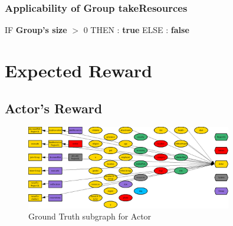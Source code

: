 \documentclass{article}%
\begin{document}
%
\subsubsection{Applicability of Group takeResources}%
\label{ssubsec:Applicability of Group takeResources}%
\begin{flushleft}%
IF %
\textbf{Group's size}%
$>$%
0%
\linebreak%
\hspace*{2em}%
THEN %
: %
\textbf{true}%
\linebreak%
\hspace*{2em}%
ELSE %
: %
\textbf{false}%
\end{flushleft}

%
\section{Expected Reward}%
\label{sec:Expected Reward}%
\subsection{Actor's Reward}%
\label{subsec:Actor's Reward}%


\begin{figure}[ht]%
\centering%
\includegraphics[width=0.8\textwidth]{images/Actor.png}%
\caption{Ground Truth subgraph for Actor}%
\end{figure}
\end{document}
